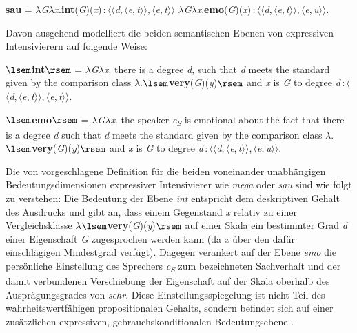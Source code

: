 \noindent
\textbf{sau} = $\lambda$\textit{G}$\lambda$\textit{x}.\textbf{int}(\textit{G})(\textit{x})\,:\,$\langle$$\langle$\textit{d},\,$\langle$\textit{e},\,\textit{t}$\rangle$$\rangle$,\,$\langle$\textit{e},\,\textit{t}$\rangle$$\rangle$ {{\larger[-1]}} $\lambda$\textit{G}$\lambda$\textit{x}.\textbf{emo}(\textit{G})(\textit{x})\,:\,$\langle$$\langle$\textit{d},\,$\langle$\textit{e},\,\textit{t}$\rangle$$\rangle$,\,$\langle$\textit{e},\,\textit{u}$\rangle$$\rangle$.
\medskip

\noindent Davon ausgehend modelliert \citet[136]{Gutzmann.2019a} die beiden semantischen Ebenen von expressiven Intensivierern auf folgende Weise: \medskip

\noindent
$\lsem$\textbf{int}$\rsem$ = $\lambda$\textit{G}$\lambda$\textit{x}. there is a degree \textit{d}, such that \textit{d} meets the standard given by the comparison class $\lambda$.$\lsem$\textbf{very}(\textit{G})(\textit{y})$\rsem$ and \textit{x} is \textit{G} to degree \textit{d}\,:\,$\langle$$\langle$\textit{d},\,$\langle$\textit{e},\,\textit{t}$\rangle$$\rangle$,\,$\langle$\textit{e},\,\textit{t}$\rangle$$\rangle$.
\medskip

\noindent
$\lsem$\textbf{emo}$\rsem$ = $\lambda$\textit{G}$\lambda$\textit{x}. the speaker \textit{c}\textsubscript{\textit{S}} is emotional about the fact that there is a degree \textit{d} such that \textit{d} meets the standard given by the comparison class $\lambda$.$\lsem$\textbf{very}(\textit{G})(\textit{y})$\rsem$ and \textit{x} is \textit{G} to degree \textit{d}\,:\,$\langle$$\langle$\textit{d},\,$\langle$\textit{e},\,\textit{t}$\rangle$$\rangle$,\,$\langle$\textit{e},\,\textit{u}$\rangle$$\rangle$.
\medskip

\noindent Die von \citet[136]{Gutzmann.2019a} vorgeschlagene Definition für die beiden voneinander unabhängigen Bedeutungsdimensionen expressiver Intensivierer wie \textit{mega} oder \textit{sau} sind wie folgt zu verstehen: Die Bedeutung der Ebene \textit{int} entspricht dem deskriptiven Gehalt des Ausdrucks und gibt an, dass einem {Gegenstand \textit{x}} relativ zu einer Vergleichsklasse $\lambda$$\lsem$\textbf{very}(\textit{G})(\textit{y})$\rsem$ auf einer Skala ein bestimmter Grad \textit{d} einer Eigenschaft \textit{G} zugesprochen werden kann (da \textit{x} über den dafür einschlägigen Mindestgrad verfügt). Dagegen verankert \citet[136]{Gutzmann.2019a} auf der Ebene \textit{emo} die persönliche Einstellung des Sprechers \textit{c\textsubscript{S}} zum bezeichneten Sachverhalt und der damit verbundenen Verschiebung der Eigenschaft auf der Skala oberhalb des Ausprägungsgrades von \textit{sehr}. Diese Einstellungsspiegelung ist nicht Teil des wahrheitswertfähigen propositionalen Gehalts, sondern befindet sich auf einer zusätzlichen expressiven, gebrauchskonditionalen Bedeutungsebene {\citep[vgl.][136]{Gutzmann.2019a}}.


